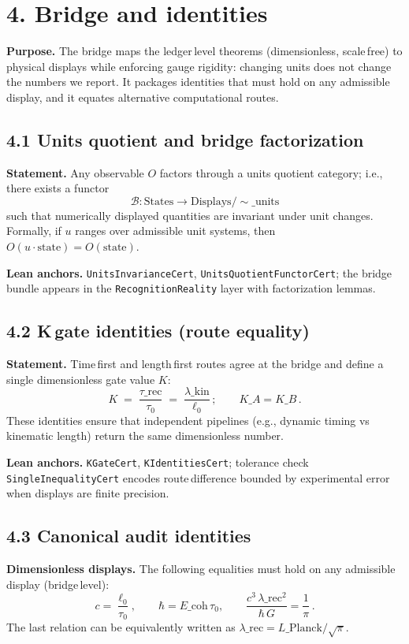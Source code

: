 \documentclass[11pt]{article}
\begin{document}
\section*{4. Bridge and identities}
\textbf{Purpose.} The bridge maps the ledger\,level theorems (dimensionless, scale\,free) to physical displays while enforcing gauge rigidity: changing units does not change the numbers we report. It packages identities that must hold on any admissible display, and it equates alternative computational routes.

\subsection*{4.1 Units quotient and bridge factorization}
\textbf{Statement.} Any observable $O$ factors through a units quotient category; i.e., there exists a functor
\[
  \mathcal B\colon \text{States} \longrightarrow \text{Displays}/\!\sim\_{\text{units}}
\]
such that numerically displayed quantities are invariant under unit changes. Formally, if $u$ ranges over admissible unit systems, then $O(u\cdot \text{state}) = O(\text{state})$.

\textbf{Lean anchors.} \texttt{UnitsInvarianceCert}, \texttt{UnitsQuotientFunctorCert}; the bridge bundle appears in the \texttt{RecognitionReality} layer with factorization lemmas.

\subsection*{4.2 K\,gate identities (route equality)}
\textbf{Statement.} Time\,first and length\,first routes agree at the bridge and define a single dimensionless gate value $K$:
\[
  K \;=\; \frac{\tau\_{\mathrm{rec}}}{\tau_0} \;=\; \frac{\lambda\_{\mathrm{kin}}}{\ell_0}\,;\qquad K\_A=K\_B\,.
\]
These identities ensure that independent pipelines (e.g., dynamic timing vs kinematic length) return the same dimensionless number.

\textbf{Lean anchors.} \texttt{KGateCert}, \texttt{KIdentitiesCert}; tolerance check \texttt{SingleInequalityCert} encodes route\,difference bounded by experimental error when displays are finite precision.

\subsection*{4.3 Canonical audit identities}
\textbf{Dimensionless displays.} The following equalities must hold on any admissible display (bridge\,level):
\[
  c=\frac{\ell_0}{\tau_0},\qquad \hbar=E\_{\mathrm{coh}}\,\tau_0,\qquad \frac{c^3\,\lambda\_{\mathrm{rec}}^2}{\hbar\,G}=\frac{1}{\pi}\,.
\]
The last relation can be equivalently written as $\lambda\_{\mathrm{rec}}=L\_{\mathrm{Planck}}/\sqrt{\pi}$.
\end{document}
